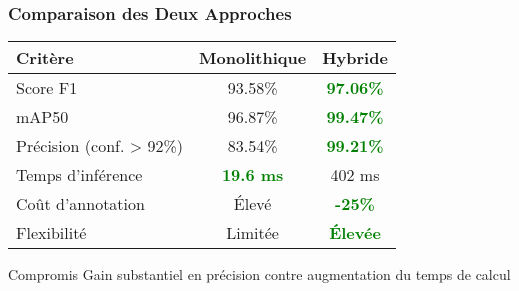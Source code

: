 \documentclass[
	11pt,
	aspectratio=169,
]{beamer}
\begin{document}
\begin{frame}
	\frametitle{Comparaison des Deux Approches}
	
	\begin{table}
		\centering
		\begin{tabular}{lcc}
			\toprule
			\textbf{Critère} & \textbf{Monolithique} & \textbf{Hybride} \\
			\midrule
			Score F1 & 93.58\% & \textcolor{green}{\textbf{97.06\%}} \\
			mAP50 & 96.87\% & \textcolor{green}{\textbf{99.47\%}} \\
			Précision (conf. > 92\%) & 83.54\% & \textcolor{green}{\textbf{99.21\%}} \\
			Temps d'inférence & \textcolor{green}{\textbf{19.6 ms}} & 402 ms \\
			Coût d'annotation & Élevé & \textcolor{green}{\textbf{-25\%}} \\
			Flexibilité & Limitée & \textcolor{green}{\textbf{Élevée}} \\
			\bottomrule
		\end{tabular}
	\end{table}
	
	\bigskip
	
	\begin{block}{Compromis}
		Gain substantiel en précision contre augmentation du temps de calcul
	\end{block}
\end{frame}

\end{document}
